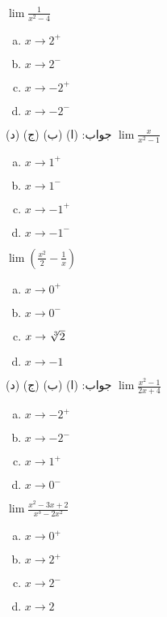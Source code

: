 $\lim \tfrac{1}{x^2-4}$
\begin{multicols}{4}
\begin{enumerate}[a.]
\item
$x\to 2^+$
\item
$x\to 2^-$
\item
$x\to -2^+$
\item
$x\to -2^-$
\end{enumerate}
\end{multicols}
جواب:\quad
(ا)  (ب)  (ج)  (د) 
$\lim\tfrac{x}{x^2-1}$
\begin{multicols}{4}
\begin{enumerate}[a.]
\item
$x\to 1^+$
\item
$x\to 1^-$
\item
$x\to -1^+$
\item
$x\to -1^-$
\end{enumerate}
\end{multicols}
$\lim(\tfrac{x^2}{2}-\tfrac{1}{x})$
\begin{multicols}{4}
\begin{enumerate}[a.]
\item
$x\to 0^+$
\item
$x\to 0^-$
\item
$x\to \sqrt[\leftroot{-2}3]{2}$
\item
$x\to -1$
\end{enumerate}
\end{multicols}
جواب:\quad
(ا)  (ب)  (ج)   (د) 
$\lim\tfrac{x^2-1}{2x+4}$
\begin{multicols}{4}
\begin{enumerate}[a.]
\item
$x\to -2^+$
\item
$x\to -2^-$
\item
$x\to 1^+$
\item
$x\to 0^-$
\end{enumerate}
\end{multicols}
$\lim\tfrac{x^2-3x+2}{x^3-2x^2}$
\begin{multicols}{4}
\begin{enumerate}[a.]
\item
$x\to 0^+$
\item
$x\to 2^+$
\item
$x\to 2^-$
\item
$x\to 2$
\end{enumerate}
\end{multicols}
